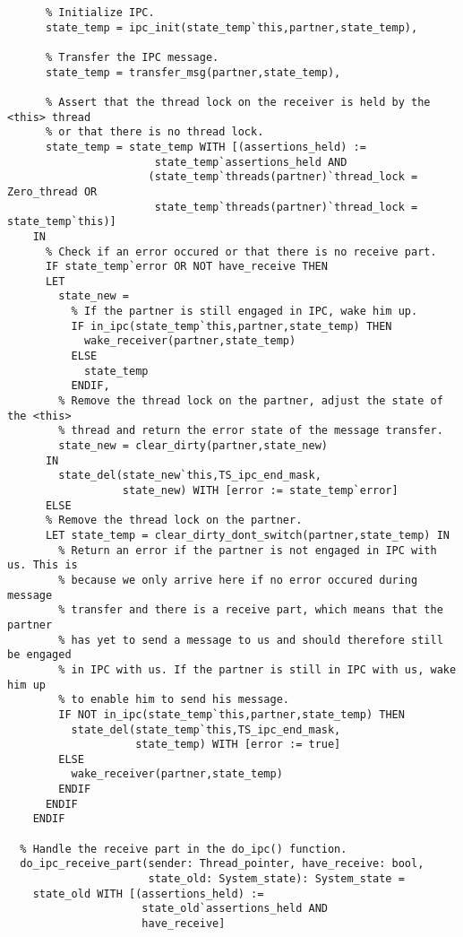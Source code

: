 \begin{lstlisting}
      % Initialize IPC.
      state_temp = ipc_init(state_temp`this,partner,state_temp),        
      
      % Transfer the IPC message.
      state_temp = transfer_msg(partner,state_temp),
       
      % Assert that the thread lock on the receiver is held by the <this> thread
      % or that there is no thread lock.
      state_temp = state_temp WITH [(assertions_held) := 
                       state_temp`assertions_held AND 
                      (state_temp`threads(partner)`thread_lock = Zero_thread OR 
                       state_temp`threads(partner)`thread_lock = state_temp`this)]
    IN
      % Check if an error occured or that there is no receive part.
      IF state_temp`error OR NOT have_receive THEN
      LET 
        state_new = 
          % If the partner is still engaged in IPC, wake him up.
          IF in_ipc(state_temp`this,partner,state_temp) THEN
            wake_receiver(partner,state_temp) 
          ELSE
            state_temp
          ENDIF,
        % Remove the thread lock on the partner, adjust the state of the <this>
        % thread and return the error state of the message transfer.
        state_new = clear_dirty(partner,state_new)
      IN
        state_del(state_new`this,TS_ipc_end_mask,
                  state_new) WITH [error := state_temp`error]
      ELSE
      % Remove the thread lock on the partner.
      LET state_temp = clear_dirty_dont_switch(partner,state_temp) IN
        % Return an error if the partner is not engaged in IPC with us. This is
        % because we only arrive here if no error occured during message 
        % transfer and there is a receive part, which means that the partner
        % has yet to send a message to us and should therefore still be engaged
        % in IPC with us. If the partner is still in IPC with us, wake him up 
        % to enable him to send his message.
        IF NOT in_ipc(state_temp`this,partner,state_temp) THEN           
          state_del(state_temp`this,TS_ipc_end_mask,
                    state_temp) WITH [error := true]
        ELSE
          wake_receiver(partner,state_temp)
        ENDIF
      ENDIF
    ENDIF
 
  % Handle the receive part in the do_ipc() function.
  do_ipc_receive_part(sender: Thread_pointer, have_receive: bool,
                      state_old: System_state): System_state =
    state_old WITH [(assertions_held) := 
                     state_old`assertions_held AND
                     have_receive]
     

\end{lstlisting}
